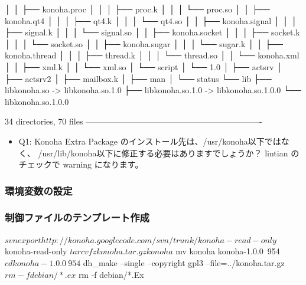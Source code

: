 \documentclass[mingoth,a4paper]{jsarticle}
\begin{document}
\begin{commandline}
    │   │       ├── konoha.proc
    │   │       │   ├── proc.k
    │   │       │   └── proc.so
    │   │       ├── konoha.qt4
    │   │       │   ├── qt4.k
    │   │       │   └── qt4.so
    │   │       ├── konoha.signal
    │   │       │   ├── signal.k
    │   │       │   └── signal.so
    │   │       ├── konoha.socket
    │   │       │   ├── socket.k
    │   │       │   └── socket.so
    │   │       ├── konoha.sugar
    │   │       │   └── sugar.k
    │   │       ├── konoha.thread
    │   │       │   ├── thread.k
    │   │       │   └── thread.so
    │   │       └── konoha.xml
    │   │           ├── xml.k
    │   │           └── xml.so
    │   └── script
    │       └── 1.0
    │           ├── actsrv
    │           ├── actsrv2
    │           ├── mailbox.k
    │           ├── man
    │           └── status
    └── lib
        ├── libkonoha.so -> libkonoha.so.1.0
        ├── libkonoha.so.1.0 -> libkonoha.so.1.0.0
        └── libkonoha.so.1.0.0

34 directories, 70 files
----------------------------------------------------------------
\end{commandline}

\begin{itemize}
\item Q1: Konoha Extra Package のインストール先は、/usr/konoha以下ではなく、
/usr/lib/konoha以下に修正する必要はありますでしょうか？
lintian のチェックで warning になります。
\end{itemize}

\subsubsection{環境変数の設定}
\subsubsection{制御ファイルのテンプレート作成}
\begin{commandline}
$ svn export http://konoha.googlecode.com/svn/trunk/ konoha-read-only
$ konoha-read-only
$ tar cvfz konoha.tar.gz konoha
$ mv konoha konoha-1.0.0~954
$ cd konoha-1.0.0~954
$ dh_make --single --copyright gpl3 --file=../konoha.tar.gz
$ rm -f debian/*.ex
$ rm -f debian/*.Ex
\end{commandline}
\end{document}
